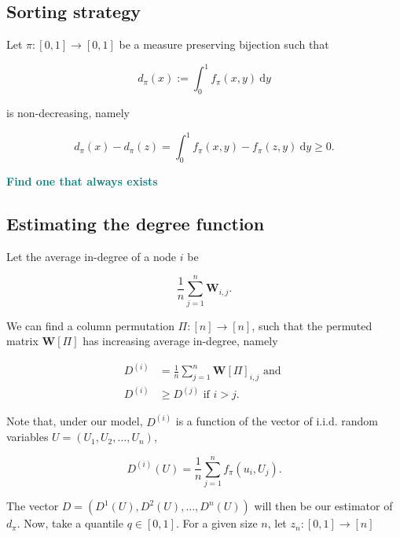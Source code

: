 \documentclass[american, abstract=on]{scrartcl}
\newcommand{\matr}[1]{\mathbf{#1}}
\newcommand{\DI}[2][y]{\int^1_0 #2 \ \text{d} #1}
\newcommand\notes[1]{\textcolor{teal}{\textbf{#1}}}
\begin{document}
\subsection{Sorting strategy}

Let $\pi: [0, 1] \to [0, 1]$ be a measure preserving bijection such that

\begin{equation} \label{eq:degree}
  d_{\pi}(x) := \DI{f_\pi(x, y)}
\end{equation}

is non-decreasing, namely

\begin{equation}
  d_{\pi}(x) - d_{\pi}(z) = \DI{f_\pi(x, y) - f_\pi(z, y)} \geq 0.
\end{equation}

\notes{Find one that always exists}

\subsection{Estimating the degree function}

Let the average in-degree of a node $i$ be 

\begin{equation}
    \frac{1}{n} \sum^n_{j = 1} \matr{W}_{i, j}.
\end{equation}

We can find a column permutation $\Pi: [n] \to [n]$, such that the permuted matrix $\matr{W}[\Pi]$ has increasing average in-degree, namely

\begin{equation}
  \begin{split}
    D^{(i)} &= \frac{1}{n} \sum^n_{j = 1} \matr{W}[\Pi]_{i, j} \text{ and } \\
    D^{(i)} &\geq D^{(j)} \text{ if } i > j.
  \end{split}
\end{equation}

Note that, under our model, $D^{(i)}$ is a function of the vector of i.i.d. random variables $U = (U_1, U_2, \ldots, U_n)$,

\begin{equation} \label{eq:estimator}
  D^{(i)}(U) =\frac{1}{n} \sum^n_{j = 1} f_{\pi}(u_i, U_j).
\end{equation}

The vector $D = (D^1(U), D^2(U), \ldots, D^n(U))$ will then be our estimator of $d_\pi$. Now, take a quantile $q \in [0, 1]$. For a given size $n$, let $z_n: [0, 1] \to [n]$ 
\end{document}
